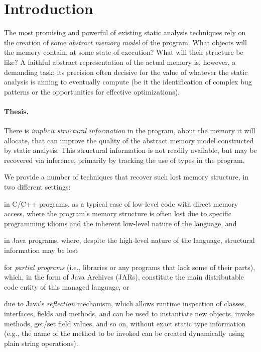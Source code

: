 \documentclass{llncs}
\begin{document}
\section{Introduction}

The most promising and powerful of existing static analysis techniques
rely on the creation of some \emph{abstract memory model} of the
program. What objects will the memory contain, at some state of
execution? What will their structure be like?  A faithful abstract
representation of the actual memory is, however, a demanding task; its
precision often decisive for the value of whatever the static
analysis is aiming to eventually compute (be it the identification of
complex bug patterns or the opportunities for effective
optimizations).

\paragraph*{Thesis.}
\begin{displayquote}
  There is \emph{implicit structural information} in the program,
  about the memory it will allocate, that can improve the quality of
  the abstract memory model constructed by static analysis. This
  structural information is not readily available, but may be
  recovered via inference, primarily by tracking the use of types in
  the program.
\end{displayquote}

\noindent
We provide a number of techniques that recover such
lost memory structure, in two different settings:
\begin{inparaenum}[(1)]
\item in C/C++ programs, as a typical case of low-level code with
  direct memory access, where the program's memory structure is often
  lost due to specific programming idioms and the inherent low-level
  nature of the language, and
\item in Java programs, where, despite the high-level nature of the
  language, structural information may be lost
  \begin{inparaenum}[(a)]
  \item for \emph{partial programs} (i.e., libraries or any programs that
    lack some of their parts), which, in the form of Java Archives
    (JARs), constitute the main distributable code entity of this
    managed language, or
  \item due to Java's \emph{reflection} mechanism, which allows
    runtime inspection of classes, interfaces, fields and methods, and
    can be used to instantiate new objects, invoke methods, get/set
    field values, and so on, without exact static type information
    (e.g., the name of the method to be invoked can be created
    dynamically using plain string operations).
  \end{inparaenum}
\end{inparaenum}
\end{document}
